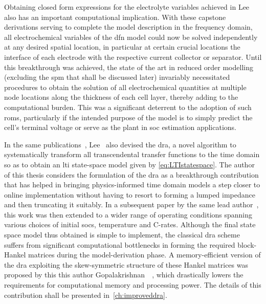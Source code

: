 Obtaining  closed form  expressions for  the electrolyte  variables achieved  in
Lee~\etal{} also has an important computational implication. With these capstone
derivations serving to  complete the model description in  the frequency domain,
all  electrochemical  variables of  the  \gls{dfn}  model  could now  be  solved
independently at any desired spatial  location, in particular at certain crucial
locations  \eg{} the  interface of  each electrode  with the  respective current
collector or separator.  Until this breakthrough was achieved, the  state of the
art in reduced order modelling (excluding  the \gls{spm} that shall be discussed
later)  invariably  necessitated  procedures  to  obtain  the  solution  of  all
electrochemical quantities  at multiple  node locations  along the  thickness of
each  cell  layer, thereby  adding  to  the  computational  burden. This  was  a
significant deterrent to  the adoption of such \glspl{rom},  particularly if the
intended purpose of  the model is to simply predict  the cell's terminal voltage
or serve as the plant in \gls{soc} estimation applications.


In the  same publications~\cite{Lee2012a,Lee2012}, Lee~\etal{} also  devised the
\gls{dra},  a novel  algorithm  to systematically  transform all  transcendental
transfer functions to  the time domain so as to  obtain an \gls{lti} state-space
model  given by  \cref{eq:LTIstatespace}. The  author of  this thesis  considers
the  formulation  of the  \gls{dra}  as  a  breakthrough contribution  that  has
helped  in  bringing  physics-informed  time  domain models  a  step  closer  to
online implementation  without having  to resort to  forming a  lumped impedance
and  then  truncating it  suitably.  In  a subsequent  paper  by  the same  lead
author~\cite{Lee2014}, this work was then extended to a wider range of operating
conditions  spanning various  choices  of initial  \glspl{soc}, temperature  and
C-rates.  Although the  final  state  space model  thus  obtained  is simple  to
implement, the classical \gls{dra} scheme suffers from significant computational
bottlenecks   in  forming   the  required   block-Hankel  matrices   during  the
model-derivation phase.  A memory-efficient version of  the \gls{dra} exploiting
the skew-symmetric structure of these Hankel  matrices was proposed by this this
author \ie{} Gopalakrishnan~\etal{}~\cite{Gopalakrishnan2017}, which drastically
lowers  the requirements  for  computational memory  and  processing power.  The
details of this contribution shall be presented in~\cref{ch:improveddra}.


